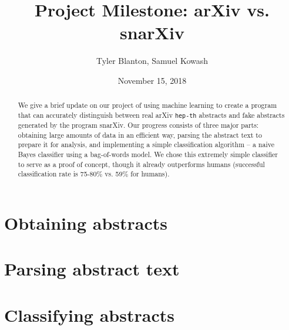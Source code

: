 \documentclass{article}
\title{Project Milestone: arXiv vs. snarXiv}
\author{Tyler Blanton, Samuel Kowash}
\date{November 15, 2018}
\begin{document}
\maketitle

\begin{abstract}
We give a brief update on our project of using machine learning to create a program that can accurately distinguish between real arXiv \texttt{hep-th} abstracts and fake abstracts generated by the program snarXiv.
Our progress consists of three major parts: obtaining large amounts of data in an efficient way, parsing the abstract text to prepare it for analysis, and implementing a simple classification algorithm -- a naive Bayes classifier using a bag-of-words model.
We chose this extremely simple classifier to serve as a proof of concept, though it already outperforms humans (successful classification rate is 75-80\% vs. 59\% for humans).
\end{abstract}

\section{Obtaining abstracts}

\section{Parsing abstract text}

\section{Classifying abstracts}
\end{document}
